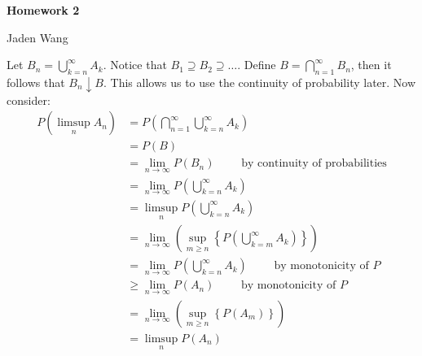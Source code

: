 \documentclass[12pt]{article}
\begin{document}
\centerline {\textsf{\textbf{\LARGE{Homework 2}}}}
\centerline {Jaden Wang}
\vspace{.15in}

\begin{problem}[1]
Let $ B_n = \bigcup_{ k =n}^{\infty} A_k$. Notice that $ B_1 \supseteq B_2 \supseteq \ldots$. Define $ B=\bigcap_{ n =1}^{\infty} B_n$, then it follows that $ B_n \downarrow B$. This allows us to use the continuity of probability later. Now consider:
\begin{align*}
	P\left( \limsup_{  n} A_n \right) &= P\left( \bigcap_{ n= 1}^{\infty} \bigcup_{k= n}^{\infty} A_k \right)  \\
					  &= P(B) \\
					  &= \lim_{ n \to \infty} P(B_n) \qquad \text{ by continuity of probabilities} \\
					  &= \lim_{ n \to \infty} P\left( \bigcup_{ k =n}^{\infty} A_k \right)  \\
					  &= \limsup_{  n} P\left( \bigcup_{ k =n}^{\infty} A_k \right)  \\
					  &= \lim_{ n \to \infty} \left( \sup_{m \geq n} \left\{ P \left( \bigcup_{ k =m}^{\infty} A_k \right)  \right\}  \right)  \\
					  &= \lim_{ n \to \infty} P\left( \bigcup_{ k =n}^{\infty} A_k \right) \qquad \text{ by monotonicity of }P  \\
					  &\geq \lim_{ n \to \infty} P(A_n) \qquad \text{ by monotonicity of }P \\
					  &= \lim_{ n \to \infty} \left( \sup_{m \geq n}\left\{ P(A_m) \right\}  \right)  \\
					  &= \limsup_{  n} P(A_n) 
\end{align*}
\end{problem}
\end{document}
